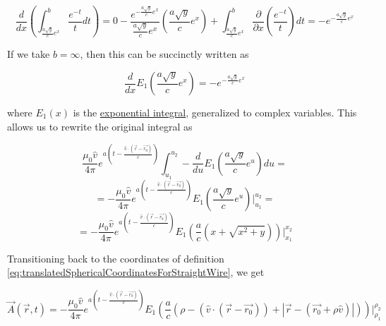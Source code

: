 ﻿\documentclass{article}
\begin{document}
\begin{equation*}
    \frac{d}{dx} \left( \int_{\frac{a \sqrt{y}}{c} e^x}^{b} \frac{e^{- t}}{t} dt \right) = 0 - \frac{e^{- \frac{a \sqrt{y}}{c} e^x}}{\frac{a \sqrt{y}}{c} e^x} (\frac{a \sqrt{y}}{c} e^x) + \int_{\frac{a \sqrt{y}}{c} e^x}^{b} \frac{\partial}{\partial x} (\frac{e^{-t}}{t}) dt = - e^{- \frac{a \sqrt{y}}{c} e^x}
\end{equation*}

If we take $b = \infty$, then this can be succinctly written as

\begin{equation*}
    \frac{d}{dx} E_1(\frac{a \sqrt{y}}{c} e^x) = - e^{- \frac{a \sqrt{y}}{c} e^x}
\end{equation*}

where $E_1(x)$ is the \href{https://en.wikipedia.org/wiki/Exponential_integral}{exponential integral}, generalized to complex variables. This allows us to rewrite the original integral as

\begin{equation*}
    \frac{\mu_0 \hat{v}}{4 \pi} e^{a(t - \frac{\hat{v} \cdot (\vec{r} - \vec{r_0})}{c})} \int_{u_1}^{u_2} - \frac{d}{du} E_1(\frac{a \sqrt{y}}{c} e^u) du =
\end{equation*}
\begin{equation*}
    = - \frac{\mu_0 \hat{v}}{4 \pi} e^{a(t - \frac{\hat{v} \cdot (\vec{r} - \vec{r_0})}{c})} E_1(\frac{a \sqrt{y}}{c} e^u) |_{u_1}^{u_2} =
\end{equation*}
\begin{equation*}
    = - \frac{\mu_0 \hat{v}}{4 \pi} e^{a(t - \frac{\hat{v} \cdot (\vec{r} - \vec{r_0})}{c})} E_1 \left( \frac{a}{c} (x + \sqrt{x^2 + y}) \right) |_{x_1}^{x_2}
\end{equation*}

Transitioning back to the coordinates of definition \ref{eq:translatedSphericalCoordinatesForStraightWire}, we get

\begin{equation}
    \label{eq:effectOfAStationaryStraightWireWithExponentialCurrentOnA}
    \vec{A}(\vec{r}, t) = - \frac{\mu_0 \hat{v}}{4 \pi} e^{a(t - \frac{\hat{v} \cdot (\vec{r} - \vec{r_0})}{c})} E_1 \left( \frac{a}{c} (\rho - (\hat{v} \cdot (\vec{r} - \vec{r_0})) + |\vec{r} - (\vec{r_0} + \rho \hat{v})|) \right) |_{\rho_1}^{\rho_2}
\end{equation}
\end{document}
